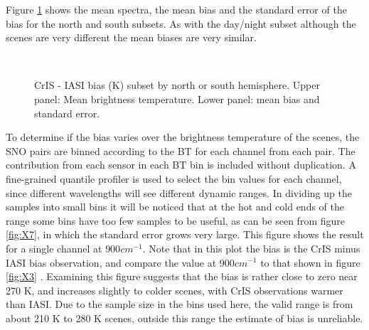 \documentclass[11pt]{article}
\begin{document}
Figure \ref{fig:X6} shows the mean spectra, the mean bias and the standard error of the bias for the north and south subsets.
As with the day/night subset although the scenes are very different the mean biases are
very similar.

\begin{figure}[htb]
  \centering
  \,
  \caption{CrIS - IASI bias (K) subset by north or south hemisphere. Upper panel: Mean brightness temperature. Lower panel: mean bias and standard error.}%
  \label{fig:X6}
\end{figure}

To determine if the bias varies over the brightness temperature of the scenes, the SNO pairs are binned according to the BT for each channel from each pair. The contribution from each sensor in each BT bin is included without duplication.  A fine-grained quantile profiler is used to select the bin values for each channel, since different wavelengths will see different dynamic ranges.  In dividing up the samples into small bins it will be noticed that at the hot and cold ends of the range some bins have too few samples to be useful, as can be seen from figure \ref{fig:X7}, in which the standard error grows very large. This figure shows the result for a single channel at $900 cm^{-1}$. Note that in this plot the bias is the CrIS minus IASI bias observation, and compare the value at \(900 cm^{-1}\) to that shown in figure \ref{fig:X3} . Examining this figure suggests that the bias is rather close to zero near 270 K, and increases slightly to colder scenes, with CrIS observations warmer than IASI. Due to the sample size in the bins used here, the valid range is from about 210 K to 280 K scenes, outside this range the estimate of bias is unreliable.
\end{document}

